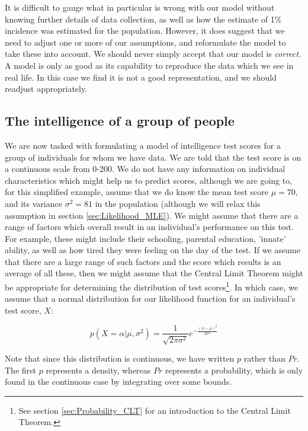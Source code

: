 \documentclass[11pt,fullpage]{book}
\begin{document}
It is difficult to gauge what in particular is wrong with our model without knowing further details of data collection, as well as how the estimate of 1\% incidence was estimated for the population. However, it does suggest that we need to adjust one or more of our assumptions, and reformulate the model to take these into account. We should never simply accept that our model is \textit{correct}. A model is only as good as its capability to reproduce the data which we see in real life. In this case we find it is not a good representation, and we should readjust appropriately.

\subsection{The intelligence of a group of people}\label{sec:Likelihood_normal}
We are now tasked with formulating a model of intelligence test scores for a group of individuals for whom we have data. We are told that the test score is on a continuous scale from 0-200. We do not have any information on individual characteristics which might help us to predict scores, although we are going to, for this simplified example, assume that we do know the mean test score $\mu=70$, and its variance $\sigma^2=81$ in the population (although we will relax this assumption in section \ref{sec:Likelihood_MLE}). We might assume that there are a range of factors which overall result in an individual's performance on this test. For example, these might include their schooling, parental education, 'innate' ability, as well as how tired they were feeling on the day of the test. If we assume that there are a large range of such factors and the score which results is an average of all these, then we might assume that the Central Limit Theorem might be appropriate for determining the distribution of test scores\footnote{See section \ref{sec:Probability_CLT} for an introduction to the Central Limit Theorem.}. In which case, we assume that a normal distribution for our likelihood function for an individual's test score, $X$:

\begin{equation}
p(X=\alpha|\mu,\sigma^2) = \frac{1}{\sqrt{2\pi\sigma^2}}e^{-\frac{(\alpha-\mu)^2}{2\sigma^2}}
\end{equation}\label{eq:Likelihood_normal}

Note that since this distribution is continuous, we have written $p$ rather than $Pr$. The first $p$ represents a density, whereas $Pr$ represents a probability, which is only found in the continuous case by integrating over some bounds.
\end{document}
